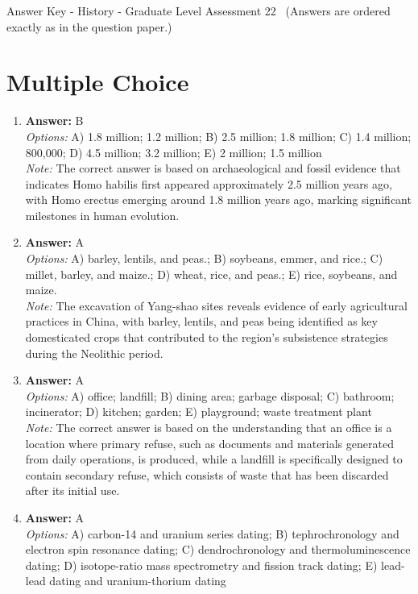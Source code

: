 \documentclass[12pt]{article}
\begin{document}
\begin{center}
Answer Key - History - Graduate Level Assessment 22 \
\small (Answers are ordered exactly as in the question paper.)
\end{center}

\section*{Multiple Choice}
\begin{enumerate}[label=\arabic*.]
\item \textbf{Answer:} B
\\ \textit{Options:} A) 1.8 million; 1.2 million; B) 2.5 million; 1.8 million; C) 1.4 million; 800,000; D) 4.5 million; 3.2 million; E) 2 million; 1.5 million
\\ \textit{Note:} The correct answer is based on archaeological and fossil evidence that indicates Homo habilis first appeared approximately 2.5 million years ago, with Homo erectus emerging around 1.8 million years ago, marking significant milestones in human evolution.
\item \textbf{Answer:} A
\\ \textit{Options:} A) barley, lentils, and peas.; B) soybeans, emmer, and rice.; C) millet, barley, and maize.; D) wheat, rice, and peas.; E) rice, soybeans, and maize.
\\ \textit{Note:} The excavation of Yang-shao sites reveals evidence of early agricultural practices in China, with barley, lentils, and peas being identified as key domesticated crops that contributed to the region's subsistence strategies during the Neolithic period.
\item \textbf{Answer:} A
\\ \textit{Options:} A) office; landfill; B) dining area; garbage disposal; C) bathroom; incinerator; D) kitchen; garden; E) playground; waste treatment plant
\\ \textit{Note:} The correct answer is based on the understanding that an office is a location where primary refuse, such as documents and materials generated from daily operations, is produced, while a landfill is specifically designed to contain secondary refuse, which consists of waste that has been discarded after its initial use.
\item \textbf{Answer:} A
\\ \textit{Options:} A) carbon-14 and uranium series dating; B) tephrochronology and electron spin resonance dating; C) dendrochronology and thermoluminescence dating; D) isotope-ratio mass spectrometry and fission track dating; E) lead-lead dating and uranium-thorium dating

\end{enumerate}
\end{document}
